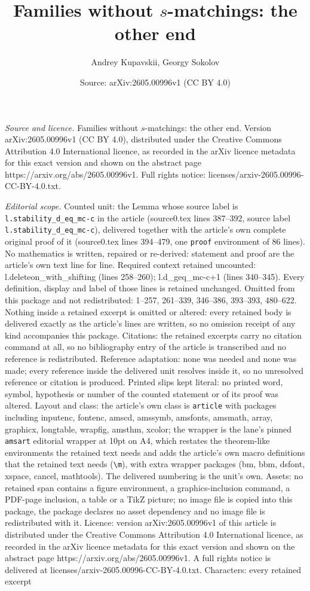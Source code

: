 \documentclass[10pt,a4paper]{amsart}
\title[Families without $s$-matchings: the other end]{Families without $s$-matchings: the other end}
\author{Andrey Kupavskii, Georgy Sokolov}
\date{Source: arXiv:2605.00996v1 (CC BY 4.0)}
\begin{document}
\maketitle

\noindent\emph{Source and licence.} Families without $s$-matchings: the other end. Version arXiv:2605.00996v1 (CC BY 4.0), distributed under the Creative Commons Attribution 4.0 International licence, as recorded in the arXiv licence metadata for this exact version and shown on the abstract page https://arxiv.org/abs/2605.00996v1. Full rights notice: licenses/arxiv-2605.00996-CC-BY-4.0.txt.\par\smallskip

\noindent\textit{Editorial scope.} Counted unit: the Lemma whose source label is \texttt{l.stability\_d\_eq\_mc-c} in the article (source0.tex lines 387--392, source label \texttt{l.stability\_d\_eq\_mc-c}), delivered together with the article's own complete original proof of it (source0.tex lines 394--479, one \texttt{proof} environment of 86 lines). No mathematics is written, repaired or re-derived: statement and proof are the article's own text line for line. Required context retained uncounted: l.deleteon\_with\_shifting (lines 258--260); l.d\_geq\_mc-c+1 (lines 340--345). Every definition, display and label of those lines is retained unchanged. Omitted from this package and not redistributed: 1--257, 261--339, 346--386, 393--393, 480--622. Nothing inside a retained excerpt is omitted or altered: every retained body is delivered exactly as the article's lines are written, so no omission receipt of any kind accompanies this package. Citations: the retained excerpts carry no citation command at all, so no bibliography entry of the article is transcribed and no reference is redistributed. Reference adaptation: none was needed and none was made; every reference inside the delivered unit resolves inside it, so no unresolved reference or citation is produced. Printed slips kept literal: no printed word, symbol, hypothesis or number of the counted statement or of its proof was altered. Layout and class: the article's own class is \texttt{article} with packages including inputenc, fontenc, amscd, amssymb, amsfonts, amsmath, array, graphicx, longtable, wrapfig, amsthm, xcolor; the wrapper is the lane's pinned \texttt{amsart} editorial wrapper at 10pt on A4, which restates the theorem-like environments the retained text needs and adds the article's own macro definitions that the retained text needs (\texttt{\textbackslash m}), with extra wrapper packages (bm, bbm, dsfont, xspace, cancel, mathtools). The delivered numbering is the unit's own. Assets: no retained span contains a figure environment, a graphics-inclusion command, a PDF-page inclusion, a table or a TikZ picture; no image file is copied into this package, the package declares no asset dependency and no image file is redistributed with it. Licence: version arXiv:2605.00996v1 of this article is distributed under the Creative Commons Attribution 4.0 International licence, as recorded in the arXiv licence metadata for this exact version and shown on the abstract page https://arxiv.org/abs/2605.00996v1. A full rights notice is delivered at licenses/arxiv-2605.00996-CC-BY-4.0.txt. Characters: every retained excerpt 
\end{document}
